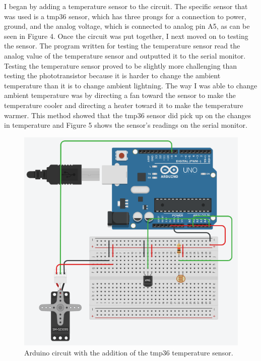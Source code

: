 \documentclass[10pt,twocolumn]{article}
\begin{document}
I began by adding a temperature sensor to the circuit. The specific sensor that was used is a tmp36 sensor, which has three prongs for a connection to power, ground, and the analog voltage, which is connected to analog pin A5, as can be seen in Figure 4. Once the circuit was put together, I next moved on to testing the sensor. The program written for testing the temperature sensor read the analog value of the temperature sensor and outputted it to the serial monitor. Testing the temperature sensor proved to be slightly more challenging than testing the phototransistor because it is harder to change the ambient temperature than it is to change ambient lightning. The way I was able to change ambient temperature was by directing a fan toward the sensor to make the temperature cooler and directing a heater toward it to make the temperature warmer. This method showed that the tmp36 sensor did pick up on the changes in temperature and Figure 5 shows the sensor’s readings on the serial monitor.

\begin{figure}
    \centering
    \includegraphics[width=.95\linewidth]{Figure 4.png}
    \caption{
        Arduino circuit with the addition of the tmp36 temperature sensor.
    }
    \label{fig:fig4}
\end{figure}
\end{document}
